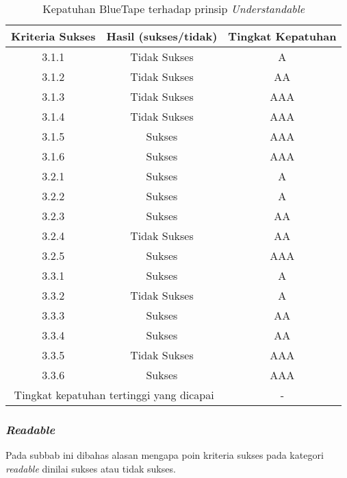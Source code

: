 \begin{table}[H]
    \centering 
    \caption{Kepatuhan BlueTape terhadap prinsip \textit{Understandable}}
    \label{tab:kepatuhan_bluetape_understandable}
    \begin{tabular}{|c|c|c|}
        \toprule
        Kriteria Sukses & Hasil (sukses/tidak) & Tingkat Kepatuhan \\

        \midrule
        \rowcolor{darkred} 3.1.1 & Tidak Sukses & A \\
        \rowcolor{brightred} 3.1.2 & Tidak Sukses & AA \\
        \rowcolor{pink} 3.1.3 & Tidak Sukses & AAA \\
        \rowcolor{pink} 3.1.4 & Tidak Sukses & AAA \\
        3.1.5 & Sukses & AAA \\
        3.1.6 & Sukses & AAA \\
        3.2.1 & Sukses & A \\
        3.2.2 & Sukses & A \\
        3.2.3 & Sukses & AA \\
        \rowcolor{brightred} 3.2.4 & Tidak Sukses & AA \\
        3.2.5 & Sukses & AAA \\
        3.3.1 & Sukses & A \\
        \rowcolor{darkred} 3.3.2 & Tidak Sukses & A \\
        3.3.3 & Sukses & AA \\
        3.3.4 & Sukses & AA \\
        \rowcolor{pink} 3.3.5 & Tidak Sukses & AAA \\
        3.3.6 & Sukses & AAA \\

        \bottomrule
        \multicolumn{2}{|c|}{Tingkat kepatuhan tertinggi yang dicapai} & - \\
        \bottomrule

    \end{tabular}
\end{table}

\subsubsection{\textit{Readable}}
\label{subsubsec:kepatuhan_bluetape_readable}
Pada subbab ini dibahas alasan mengapa poin kriteria sukses pada kategori \textit{readable} dinilai sukses atau tidak sukses.

